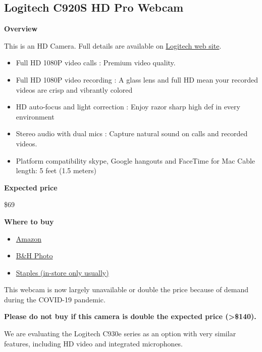 \subsection{Logitech C920S HD Pro Webcam}
\label{sec:equipment::logitech-920}

\begin{gram}
\label{grm:equipment::logitech-920::main}
\textbf{Overview}

This is an HD Camera.  Full details are available on 
%
\href{https://www.logitech.com/en-us/product/hd-pro-webcam-c920s}{Logitech web site}.
%
\begin{itemize}
\item
Full HD 1080P video calls : Premium video quality.
\item
Full HD 1080P video recording : A glass lens and full HD mean your recorded videos are crisp and vibrantly colored
\item
HD auto-focus and light correction : Enjoy razor sharp high def in every environment

\item
Stereo audio with dual mics : Capture natural sound on calls and recorded videos. 

\item 
Platform compatibility skype, Google hangouts and FaceTime for Mac
Cable length: 5 feet (1.5 meters)
\end{itemize}


\textbf{Expected price}

\$69

\textbf{Where to buy}

\begin{itemize}
\item
\href{https://www.amazon.com/Logitech-Widescreen-Calling-Recording-Desktop/dp/B006JH8T3S/ref=sr_1_2?crid=2T6CQ3HNRR1XR&keywords=logitech+c920&qid=1582900645&s=electronics&sprefix=logitech+c,electronics,172&sr=1-2}{Amazon}
\item
\href{https://www.bhphotovideo.com/c/product/1461727-REG/logitech_960_001257_c920s_hd_pro_webcam.html}{B\&H Photo}
\item
\href{https://www.staples.com/logitech-c920s-pro-hd-webcam/product_24383955}{Staples (in-store only usually)}
\end{itemize}

This webcam is now largely unavailable or double the price because of demand during the
COVID-19 pandemic.

\textbf{Please do not buy if this camera is double the expected price (>\$140).}

We are evaluating the Logitech C930e series as an
option with very similar features, including HD video and integrated
microphones.
\end{gram}

